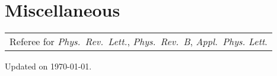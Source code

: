 \documentclass[a4paper, 11pt, DIV=15,headings=normal]{scrartcl}
\begin{document}
\section*{Miscellaneous}
\begin{tabular}{l}
Referee for \textit{Phys.\ Rev.\ Lett.}, \textit{Phys.\ Rev.\ B}, \textit{Appl.\ Phys. Lett}.
\end{tabular}

\newrefsegment
\AtNextBibliography{\small}
\nocite{Chen2019,Chen2016,Chen2015,Chen2017,Chen2018a}
\printbibliography[segment=1,heading=bibselect,title={Selected Publications},env=bibselect]

\newrefsegment
\AtNextBibliography{\small}
\nocite{*}
\printbibliography[resetnumbers=true,title={Publications in Chronological Order}]

\bigskip

\begin{minipage}{0.4\linewidth}
\scriptsize Updated on \today.
\end{minipage}
\end{document}
